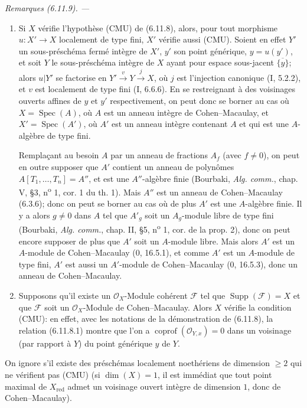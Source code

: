 \documentclass[10pt,oneside]{book}
\newcommand{\oldpage}[2][]{%
  \setcounter{footnote}{0}%
  \marginpar{\scriptsize\textbf{#1}~|~#2}\ignorespaces}
\newenvironment{remarks}[1][]{%
  \par\medskip\noindent\itshape Remarques (#1). ---\ }{\par}
\begin{document}
\begin{remarks}[6.11.9]
\label{IV.2.s6.11.9-fr}
\begin{enumerate}
\item[(i)] Si $X$ vérifie l'hypothèse (CMU) de (6.11.8), alors, pour tout
morphisme $u:X'\to X$ localement de type fini, $X'$ vérifie aussi (CMU).
Soient en effet $Y'$ un sous-préschéma fermé intègre de $X'$, $y'$ son point
générique, $y=u(y')$, et soit $Y$ le sous-préschéma intègre de $X$ ayant
pour espace sous-jacent $\overline{\{y\}}$; alors $u|Y'$ se factorise en
$Y'\xrightarrow{v}Y\xrightarrow{j}X$, où $j$ est l'injection canonique
(I, 5.2.2), et $v$ est localement de type fini (I, 6.6.6). En se
restreignant à des voisinages ouverts affines de $y$ et $y'$ respectivement,
on peut donc se borner au cas où $X=\operatorname{Spec}(A)$, où $A$ est un
anneau intègre de Cohen--Macaulay, et $X'=\operatorname{Spec}(A')$, où $A'$
est un anneau intègre contenant $A$ et qui est une $A$-algèbre de type fini.

\oldpage[IV-2]{163}

Remplaçant au besoin $A$ par un anneau de fractions $A_f$ (avec $f\ne0$),
on peut en outre supposer que $A'$ contient un anneau de polynômes
$A[T_1,\ldots,T_n]=A''$, et est une $A''$-algèbre finie (Bourbaki,
\emph{Alg. comm.}, chap. V, \S3, n\textsuperscript{o} 1, cor. 1 du th. 1).
Mais $A''$ est un anneau de Cohen--Macaulay (6.3.6); donc on peut se borner
au cas où de plus $A'$ est une $A$-algèbre finie. Il y a alors $g\ne0$ dans
$A$ tel que $A'_g$ soit un $A_g$-module libre de type fini (Bourbaki,
\emph{Alg. comm.}, chap. II, \S5, n\textsuperscript{o} 1, cor. de la
prop. 2), donc on peut encore supposer de plus que $A'$ soit un $A$-module
libre. Mais alors $A'$ est un $A$-module de Cohen--Macaulay (0, 16.5.1), et
comme $A'$ est un $A$-module de type fini, $A'$ est aussi un $A'$-module de
Cohen--Macaulay (0, 16.5.3), donc un anneau de Cohen--Macaulay.
\item[(ii)] Supposons qu'il existe un $\mathcal O_X$-Module cohérent
$\mathcal F$ tel que $\operatorname{Supp}(\mathcal F)=X$ et que
$\mathcal F$ soit un $\mathcal O_X$-Module de Cohen--Macaulay. Alors $X$
vérifie la condition (CMU): en effet, avec les notations de la démonstration
de (6.11.8), la relation (6.11.8.1) montre que l'on a
$\operatorname{coprof}(\mathcal O_{Y,x})=0$ dans un voisinage (par rapport
à $Y$) du point générique $y$ de $Y$.
\end{enumerate}

On ignore s'il existe des préschémas localement noethériens de dimension
$\geq2$ qui ne vérifient pas (CMU) (si $\dim(X)=1$, il est immédiat que tout
point maximal de $X_{\mathrm{red}}$ admet un voisinage ouvert intègre de
dimension $1$, donc de Cohen--Macaulay).
\end{remarks}
\end{document}

